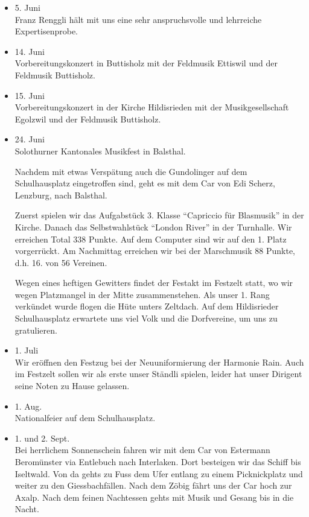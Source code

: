 \begin{history}
\begin{itemize}
        \item[]5. Juni\\
        Franz Renggli hält mit uns eine sehr anspruchsvolle und lehrreiche
        Expertisenprobe.

        \item[]14. Juni\\
        Vorbereitungskonzert in Buttisholz mit der Feldmusik Ettiswil und der
        Feldmusik Buttisholz.

        \item[]15. Juni\\
        Vorbereitungskonzert in der Kirche Hildisrieden mit der
        Musikgesellschaft Egolzwil und der Feldmusik Buttisholz.

        \item[]24. Juni\\
        Solothurner Kantonales Musikfest in Balsthal.

        Nachdem mit etwas Verspätung auch die Gundolinger auf dem Schulhausplatz
        eingetroffen sind, geht es mit dem Car von Edi Scherz, Lenzburg, nach
        Balsthal.

        Zuerst spielen wir das Aufgabstück 3. Klasse \enquote{Capriccio für
            Blasmusik} in der Kirche. Danach das Selbstwahlstück \enquote{London
            River} in der Turnhalle. Wir erreichen Total 338 Punkte. Auf dem
        Computer sind wir auf den 1. Platz vorgerrückt. Am Nachmittag
        erreichen wir bei der Marschmusik 88 Punkte, d.h. 16. von 56
        Vereinen.

        Wegen eines heftigen Gewitters findet der Festakt im Festzelt statt, wo
        wir wegen Platzmangel in der Mitte zusammenstehen. Als unser 1. Rang
        verkündet wurde flogen die Hüte unters Zeltdach. Auf dem Hildisrieder
        Schulhausplatz erwartete uns viel Volk und die Dorfvereine, um uns zu
        gratulieren.

        \item[]1. Juli\\
        Wir eröffnen den Festzug bei der Neuuniformierung der Harmonie Rain.
        Auch im Festzelt sollen wir als erste unser Ständli spielen, leider hat
        unser Dirigent seine Noten zu Hause gelassen.

        \item[]1. Aug.\\
        Nationalfeier auf dem Schulhausplatz.

        \item[]1. und 2. Sept.\\
        Bei herrlichem Sonnenschein fahren wir mit dem Car von Estermann
        Beromünster via Entlebuch nach Interlaken. Dort besteigen wir das Schiff
        bis Iseltwald. Von da gehts zu Fuss dem Ufer entlang zu einem
        Picknickplatz und weiter zu den Giessbachfällen. Nach dem Zöbig fährt
        uns der Car hoch zur Axalp. Nach dem feinen Nachtessen gehts mit Musik
        und Gesang bis in die Nacht.


\end{itemize}
\end{history}
